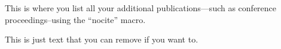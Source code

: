 This is where you list all your additional publications---such as conference proceedings--using the ``nocite'' macro.

\nocite{matlab:ode,kzfmodel_hanjalic2004}
\printbibliography[heading=none]


This is just text that you can remove if you want to. 